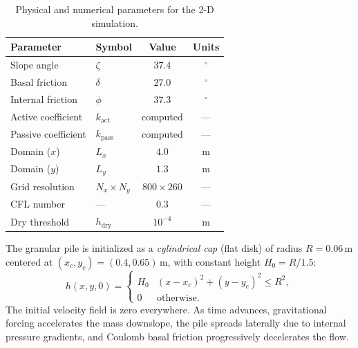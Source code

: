 \documentclass[10pt, conference]{FMFP2023}
\begin{document}
\begin{table}[htbp]
\caption{Physical and numerical parameters for the 2-D simulation.}
\label{tab:params}
\centering
\begin{tabular}{@{}llcc@{}}
\toprule
\textbf{Parameter}   & \textbf{Symbol}          & \textbf{Value}   & \textbf{Units} \\
\midrule
Slope angle          & $\zeta$                  & $37.4$           & $^\circ$       \\
Basal friction       & $\delta$                 & $27.0$           & $^\circ$       \\
Internal friction    & $\phi$                   & $37.3$           & $^\circ$       \\
Active coefficient   & $k_{\text{act}}$         & computed         & ---            \\
Passive coefficient  & $k_{\text{pass}}$        & computed         & ---            \\
Domain ($x$)         & $L_x$                    & $4.0$            & m              \\
Domain ($y$)         & $L_y$                    & $1.3$            & m              \\
Grid resolution      & $N_x \times N_y$         & $800\times260$   & ---            \\
CFL number           & ---                      & $0.3$            & ---            \\
Dry threshold        & $h_{\text{dry}}$         & $10^{-4}$        & m              \\
\bottomrule
\end{tabular}
\end{table}

The granular pile is initialized as a \emph{cylindrical cap}
(flat disk) of radius $R=0.06$\,m centered at
$(x_c,y_c)=(0.4,0.65)$\,m, with constant height $H_0=R/1.5$:
\begin{equation}
    h(x,y,0) =
    \begin{cases}
        H_0 & (x-x_c)^2+(y-y_c)^2 \leq R^2, \\
        0   & \text{otherwise.}
    \end{cases}
    \label{eq:initial_condition}
\end{equation}
The initial velocity field is zero everywhere.
As time advances, gravitational forcing accelerates the mass
downslope, the pile spreads laterally due to internal pressure
gradients, and Coulomb basal friction progressively decelerates the
flow.
\end{document}
